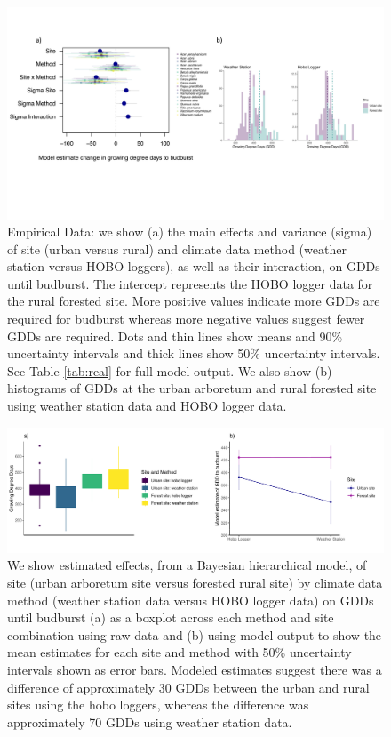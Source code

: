 \documentclass{article}\usepackage[]{graphicx}\usepackage[]{color}
\begin{document}
\begin{figure}[H]
    \centering
    \includegraphics[width=16cm, trim=0cm 5cm 0cm 0cm,]{..//analyses/figures/muandgdd.pdf}
\caption{ Empirical Data: we show (a) the main effects and variance (sigma) of site (urban versus rural) and climate data method (weather station versus HOBO loggers), as well as their interaction, on GDDs until budburst. The intercept represents the HOBO logger data for the rural forested site. More positive values indicate more GDDs are required for budburst whereas more negative values suggest fewer GDDs are required. Dots and thin lines show means and 90\% uncertainty intervals and thick lines show 50\% uncertainty intervals. See Table \ref{tab:real} for full model output. We also show (b) histograms of GDDs at the urban arboretum and rural forested site using weather station data and HOBO logger data.}
\label{fig:real}
\end{figure}

\begin{figure}[H]
      \centering
      \includegraphics[width=16cm]{..//analyses/figures/gdd_interaction.pdf} 
\caption{ We show estimated effects, from a Bayesian hierarchical model, of site (urban arboretum site versus forested rural site) by climate data method (weather station data versus HOBO logger data) on GDDs until budburst (a) as a boxplot across each method and site combination using raw data and (b) using model output to show the mean estimates for each site and method with 50\% uncertainty intervals shown as error bars. Modeled estimates suggest there was a difference of approximately 30 GDDs between the urban and rural sites using the hobo loggers, whereas the difference was approximately 70 GDDs using weather station data.}
\label{fig:interaction}
\end{figure}
\end{document}
